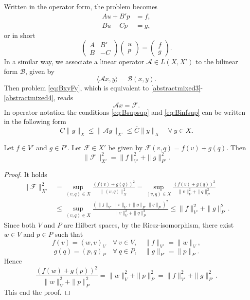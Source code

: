 Written in the operator form, the problem becomes
\begin{align}
Au+ B'p & =f, \label{abstractmixedoperator3}\\
Bu-Cp & =g, \label{abstractmixedoperator4}
\end{align}
or in short
\begin{equation*}%
\begin{pmatrix}
A &  B' \\
B & -C
\end{pmatrix}
\begin{pmatrix}
u \\ p
\end{pmatrix}
=
\begin{pmatrix}
f \\ g
\end{pmatrix}.
\end{equation*}
In a similar way, we associate a linear operator $\mathcal A\in L(X, X')$ to the bilinear form $\mathcal B$, given by
\[
\langle\mathcal Ax, y\rangle = \mathcal B(x,y).
\]
Then problem \eqref{eq:BxyFy}, which is equivalent to \eqref{abstractmixed3}-\eqref{abstractmixed4}, reads
\begin{equation}\label{eq:operatormathcalAF}
\mathcal Ax=\mathcal F.
\end{equation}
In operator notation the conditions \eqref{eq:Bsupsup} and \eqref{eq:Binfsup} can be written in the
following form
\begin{equation}\label{eq:operatormathcalAsupinf}
\underline{C}\|y\|_X\leq\|\mathcal A y\|_{X'}\leq \overline{C}\|y\|_X \quad \forall~y\in X.
\end{equation}

\begin{lemma}\label{lem:zulehnerrhs}
Let $f\in V'$ and $g\in P'$. Let $\mathcal F\in X'$ be given by $\mathcal F(v, q)=f(v)+g(q)$. Then
\[
\|\mathcal F\|_{X'}^2=\|f\|_{V'}^2+\|g\|_{P'}^2.
\]
\end{lemma}
\begin{proof}
It holds
\begin{align*}
\|\mathcal F\|_{X'}^2&=\sup_{(v,q)\in X}\frac{(f(v)+g(q))^2}{\|(v,q)\|_X^2}=\sup_{(v,q)\in X}\frac{(f(v)+g(q))^2}{\|v\|_V^2+\|q\|_P^2} \\
&\leq\sup_{(v,q)\in X}\frac{(\|f\|_{V'}\|v\|_{V}+\|g\|_{P'}\|q\|_{P})^2}{\|v\|_V^2+\|q\|_P^2}\leq \|f\|_{V'}^2+\|g\|_{P'}^2.
\end{align*}
Since both $V$ and $P$ are Hilbert spaces, by the Riesz-isomorphism, there exist $w\in V$ and $p\in P$ such that
\[
f(v)=(w, v)_V \quad \forall~v\in V, \quad  \|f\|_{V'}=\|w\|_{V}, 
\]
\[
g(q)=(p, q)_P \quad \forall~q\in P, \quad \|g\|_{P'}=\|p\|_{P}.
\]
Hence
\[
\frac{(f(w)+g(p))^2}{\|w\|_V^2+\|p\|_P^2} = \|w\|_{V}^2+\|p\|_{P}^2=\|f\|_{V'}^2+\|g\|_{P'}^2.
\]
This end the proof.
\end{proof}


